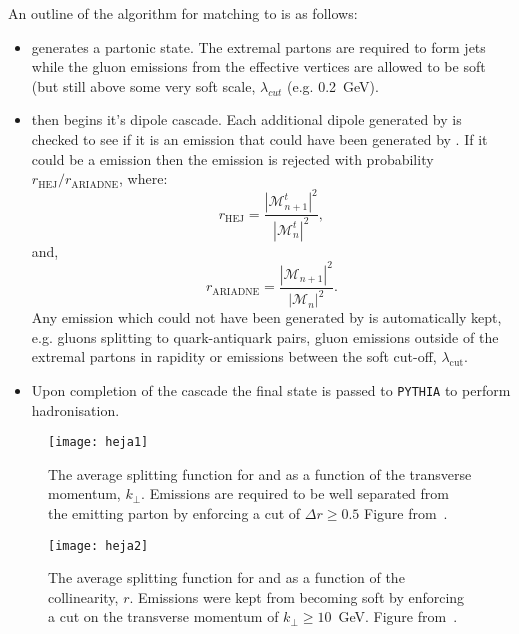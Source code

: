 		An outline of the algorithm for matching \ARIADNE to \HEJ is as follows:

		\begin{itemize}
			\item \HEJ generates a partonic state.  The extremal partons are required to form jets while
			the gluon emissions from the effective vertices are allowed to be soft (but still above some very soft scale, $\lambda_{cut}$
			(e.g. 0.2~GeV).

			\item \ARIADNE then begins it's dipole cascade.  Each additional dipole generated by \ARIADNE is checked to see
			if it is an emission that could have been generated by \HEJ.  If it could be a \hej emission then the emission
			is rejected with probability $r_{\text{HEJ}} / r_{\text{ARIADNE}}$, where:
			\begin{equation}
				r_{\text{HEJ}} = \frac{|\mathcal{M}^t_{n+1}|^2}{|\mathcal{M}^t_{n}|^2},
			\end{equation}
			and,
			\begin{equation}
				r_{\text{ARIADNE}} = \frac{|\mathcal{M}_{n+1}|^2}{|\mathcal{M}_{n}|^2}.
			\end{equation}
			Any emission which could not have been generated by \HEJ is automatically kept, e.g. gluons splitting
			to quark-antiquark pairs, gluon emissions outside of the extremal partons in rapidity or emissions between
			the \hej soft cut-off, $\lambda_{\text{cut}}$.
			\item Upon completion of the cascade the final state is passed to \texttt{PYTHIA} to perform hadronisation.
		\end{itemize}

		\begin{figure}[hbt]
			\centering
			\texttt{[image: heja1]}
			\caption{The average splitting function for \HEJ and \ARIADNE as a function of the transverse momentum, $k_\perp$.
			Emissions are required to be well separated from the emitting parton by enforcing a cut of $\Delta r\geq0.5$
			Figure from~\cite{Andersen:2011zd}.}
			\label{fig:heja1}
		\end{figure}

		\begin{figure}[hbt]
			\centering
			\texttt{[image: heja2]}
			\caption{The average splitting function for \HEJ and \ARIADNE as a function of the collinearity, $r$.
			Emissions were kept from becoming soft by enforcing a cut on the transverse momentum of $k_\perp\geq10$~GeV.
			Figure from~\cite{Andersen:2011zd}.}
			\label{fig:heja2}
		\end{figure}

